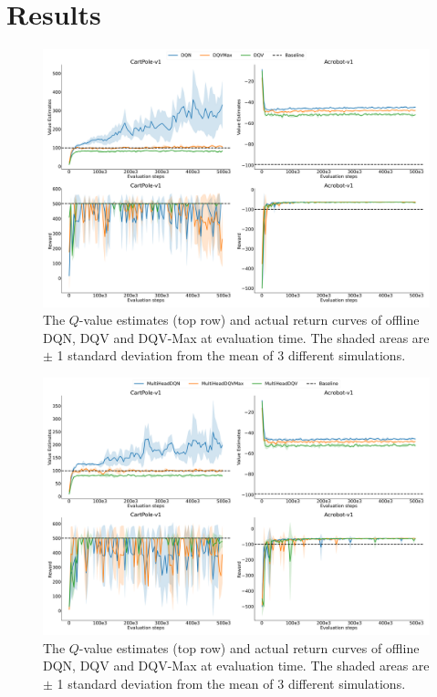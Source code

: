 \section{Results}\label{sec:results}

\begin{figure}[!tbp]
  \centering
  \includegraphics[width=.5\textwidth]{img/dshift_plots_normal.png}
  \caption{The $Q$-value estimates (top row) and actual return curves
    of offline DQN, DQV and DQV-Max at evaluation time. The shaded
    areas are $\pm$ 1 standard deviation from the mean of 3 different
    simulations.}\label{fig:dshift_offline_normal}
\end{figure}

\begin{figure}[!tbp]
  \centering
  \includegraphics[width=.5\textwidth]{img/dshift_plots_ensembles.png}
  \caption{The $Q$-value estimates (top row) and actual return curves
    of offline DQN, DQV and DQV-Max at evaluation time. The shaded
    areas are $\pm$ 1 standard deviation from the mean of 3 different
    simulations.}\label{fig:dshift_offline_ensembles}
\end{figure}